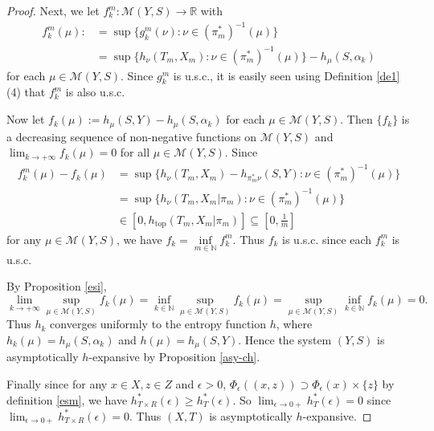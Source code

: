 \documentclass[12pt]{amsart}
\theoremstyle{definition} \theoremstyle{question}
\numberwithin{equation}{section}
\begin{document}
\begin{proof}
Next, we let $f_k^m: \mathcal{M}(Y,S)\rightarrow \mathbb{R}$ with
\begin{align*}
f_k^m(\mu):&=\sup\{ g_k^m(\nu):\nu \in
(\pi_m^*)^{-1}(\mu)\}\\
&=\sup\{ h_\nu(T_m,X_m):\nu \in
(\pi_m^*)^{-1}(\mu)\}-h_{\mu}(S,\alpha_k)
 \end{align*} for each $\mu\in
\mathcal{M}(Y,S)$. Since $g_k^m$ is u.s.c., it is easily seen using
Definition \ref{de1} (4) that $f_k^m$ is also u.s.c.

Now let $f_k(\mu):=h_{\mu}(S,Y)-h_{\mu}(S,\alpha_k)$ for each $\mu\in
\mathcal{M}(Y,S)$. Then $\{f_k\}$ is a decreasing sequence of
non-negative functions on $\mathcal{M}(Y,S)$ and $\lim_{k\rightarrow
+\infty}f_k(\mu)=0$ for all $\mu\in \mathcal{M}(Y,S)$. Since
\begin{align*}
f_k^m(\mu)-f_k(\mu)&=\sup\{ h_\nu(T_m,X_m)-h_{\pi_m^*\nu}(S,Y):\nu
\in (\pi_m^*)^{-1}(\mu)\}\\ &=\sup\{ h_\nu(T_m,X_m|\pi_m):\nu \in
(\pi_m^*)^{-1}(\mu)\}\\
& \in [0,h_{\text{top}}(T_m,X_m|\pi_m)]\subseteq [0,\frac{1}{m}]
\end{align*}
for any $\mu\in \mathcal{M}(Y,S)$,  we have $f_k=\inf\limits_{m\in
\mathbb{N}}f_k^m$. Thus $f_k$ is u.s.c. since each $f_k^m$ is u.s.c.

By Proposition \ref{esi},
$$\lim_{k\rightarrow +\infty} \sup_{\mu\in
\mathcal{M}(Y,S)}f_k(\mu)=\inf_{k\in \mathbb{N}} \sup_{\mu\in
\mathcal{M}(Y,S)}f_k(\mu)= \sup_{\mu\in \mathcal{M}(Y,S)}\inf_{k\in
\mathbb{N}}f_k(\mu)=0.$$ Thus $h_k$  converges uniformly to the
entropy function $h$, where $h_k(\mu)=h_{\mu}(S,\alpha_k)$ and
$h(\mu)=h_{\mu}(S,Y)$. Hence the system $(Y,S)$ is asymptotically $h$-expansive
by Proposition \ref{asy-ch}.

Finally since for any $x\in X,z\in Z$ and $\epsilon>0$,
$\Phi_\epsilon((x,z))\supset \Phi_\epsilon(x)\times \{z\}$ by
definition \eqref{esm}, we have $h_{T\times R}^*(\epsilon)\ge
h_{T}^*(\epsilon)$. So $\lim_{\epsilon\rightarrow 0+}
h_T^*(\epsilon)=0$ since $\lim_{\epsilon\rightarrow 0+} h_{T\times
R}^*(\epsilon)=0$. Thus $(X,T)$ is asymptotically $h$-expansive.
\end{proof}
\end{document}
